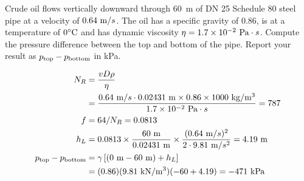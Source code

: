 \documentclass[multi,preview,varwidth=false,border=5,12pt]{standalone}
\begin{document}
\begin{question}

Crude oil flows vertically downward through 60~m of DN 25 Schedule 80 steel pipe at a velocity of $0.64~\mathrm{m}/s$.  The oil has a specific gravity of 0.86, is at a temperature of $0^\circ\mathrm{C}$ and has dynamic viscosity $\eta=1.7\times 10^{-2}~\mathrm{Pa}\cdot s$.  Compute the pressure difference between the top and bottom of the pipe.  Report your result as $p_{\rm top}-p_{\rm bottom}$ in kPa.

\begin{solution}
\begin{align*}
N_R&=\frac{vD\rho}{\eta}\\
&=\frac{0.64~\mathrm{m}/s\cdot 0.02431~\mathrm{m}\times 0.86\times 1000~\mathrm{kg}/\mathrm{m}^3}{1.7\times 10^{-2}~\mathrm{Pa}\cdot s}=787 \\
f&= 64/N_R= 0.0813 \\
h_L&=0.0813\times \frac{60~\mathrm{m}}{0.02431~\mathrm{m}}\times \frac{(0.64~\mathrm{m}/s)^2}{2\cdot 9.81~\mathrm{m}/s^2}=4.19~\mathrm{m} \\
p_{\rm top}-p_{\rm bottom}&=\gamma \left[\left(0~\mathrm{m} - 60~\mathrm{m}\right)+h_L\right] \\
&= (0.86)(9.81~\mathrm{kN}/\mathrm{m}^3)(-60+4.19)=-471~\rm{kPa}
\end{align*}
\end{solution}

\end{question}
\end{document}
